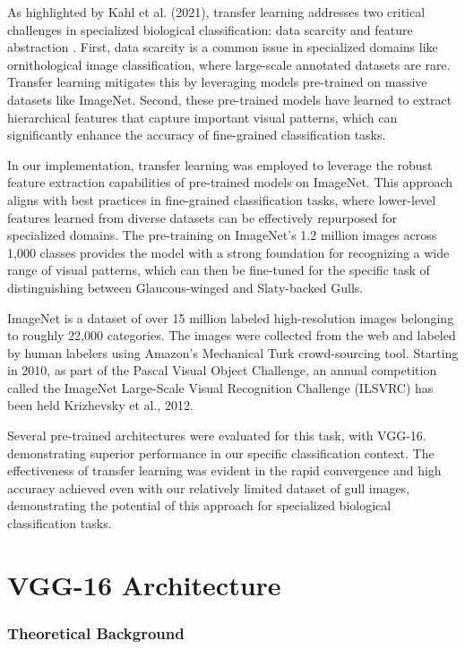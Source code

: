 \documentclass[a4paper,12pt]{article}
\begin{document}
As highlighted by Kahl et al. (2021), transfer learning addresses two critical challenges in specialized biological classification: data scarcity and feature abstraction \citet{kahl2021}. First, data scarcity is a common issue in specialized domains like ornithological image classification, where large-scale annotated datasets are rare. Transfer learning mitigates this by leveraging models pre-trained on massive datasets like ImageNet. Second, these pre-trained models have learned to extract hierarchical features that capture important visual patterns, which can significantly enhance the accuracy of fine-grained classification tasks.

In our implementation, transfer learning was employed to leverage the robust feature extraction capabilities of pre-trained models on ImageNet. This approach aligns with best practices in fine-grained classification tasks, where lower-level features learned from diverse datasets can be effectively repurposed for specialized domains. The pre-training on ImageNet's 1.2 million images across 1,000 classes provides the model with a strong foundation for recognizing a wide range of visual patterns, which can then be fine-tuned for the specific task of distinguishing between Glaucous-winged and Slaty-backed Gulls.

ImageNet is a dataset of over 15 million labeled high-resolution images belonging to roughly 22,000
categories. The images were collected from the web and labeled by human labelers using Amazon’s Mechanical Turk crowd-sourcing tool. Starting in 2010, as part of the Pascal Visual Object
Challenge, an annual competition called the ImageNet Large-Scale Visual Recognition Challenge
(ILSVRC) has been held {Krizhevsky et al., 2012}.

Several pre-trained architectures were evaluated for this task, with VGG-16. \citet{simonyan2014vgg} demonstrating superior performance in our specific classification context. The effectiveness of transfer learning was evident in the rapid convergence and high accuracy achieved even with our relatively limited dataset of gull images, demonstrating the potential of this approach for specialized biological classification tasks.

\section{VGG-16 Architecture}

\subsubsection{Theoretical Background}
\end{document}
